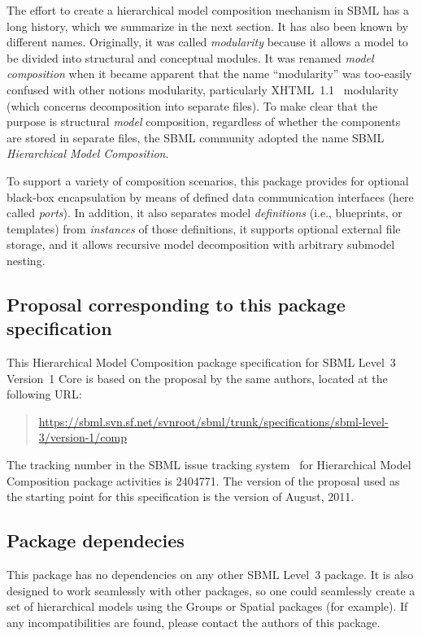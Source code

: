 The effort to create a hierarchical model composition mechanism in SBML
has a long history, which we summarize in the next section.  It has also
been known by different names.  Originally, it was called
\emph{modularity} because it allows a model to be divided into
structural and conceptual modules.  It was renamed \emph{model
  composition} when it became apparent that the name ``modularity'' was
too-easily confused with other notions modularity, particularly
XHTML~1.1~\cite{} modularity (which concerns decomposition into separate
files).  To make clear that the purpose is structural \emph{model}
composition, regardless of whether the components are stored in separate
files, the SBML community adopted the name SBML \emph{Hierarchical Model
  Composition}.

To support a variety of composition scenarios, this package provides for
optional black-box encapsulation by means of defined data communication
interfaces (here called \emph{ports}).  In addition, it also separates
model \emph{definitions} (i.e., blueprints, or templates) from
\emph{instances} of those definitions, it supports optional external
file storage, and it allows recursive model decomposition with arbitrary
submodel nesting.


\subsection{Proposal corresponding to this package specification}

This Hierarchical Model Composition package specification for SBML
Level~3 Version~1 Core is based on the proposal by the same authors,
located at the following URL:

\begin{quote}\small
  \url{https://sbml.svn.sf.net/svnroot/sbml/trunk/specifications/sbml-level-3/version-1/comp}
\end{quote}

The tracking number in the SBML issue tracking system~\cite{t} for
Hierarchical Model Composition package activities is 2404771.  The
version of the proposal used as the starting point for this
specification is the version of August, 2011.


\subsection{Package dependecies}

This package has no dependencies on any other SBML Level~3 package.  It
is also designed to work seamlessly with other packages, so one could
seamlessly create a set of hierarchical models using the Groups or
Spatial packages (for example).  If any incompatibilities are found,
please contact the authors of this package.


